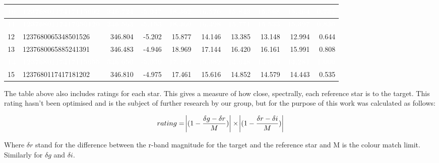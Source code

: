 \documentclass[]{elsarticle} %
\begin{document}
\begin{table}[H]
\begin{tabular}{l|l|r|r|r|r|r|r|r|r}
\hline
\rowcolor[HTML]{D7261E}  \textcolor{white}{\textbf{10}} & \textcolor{white}{\textbf{1237680117417115692}} & \textcolor{white}{\textbf{346.724}} & \textcolor{white}{\textbf{-5.047}} & \textcolor{white}{\textbf{18.362}} & \textcolor{white}{\textbf{16.576}} & \textcolor{white}{\textbf{15.843}} & \textcolor{white}{\textbf{15.568}} & \textcolor{white}{\textbf{15.464}} & \textcolor{white}{\textbf{0.734}}\\
\hline
\rowcolor[HTML]{D7261E}  \textcolor{white}{\textbf{11}} & \textcolor{white}{\textbf{1237680117417050120}} & \textcolor{white}{\textbf{346.563}} & \textcolor{white}{\textbf{-5.153}} & \textcolor{white}{\textbf{18.460}} & \textcolor{white}{\textbf{16.498}} & \textcolor{white}{\textbf{15.771}} & \textcolor{white}{\textbf{15.533}} & \textcolor{white}{\textbf{15.397}} & \textcolor{white}{\textbf{0.830}}\\
\hline
12 & 1237680065348501526 & 346.804 & -5.202 & 15.877 & 14.146 & 13.385 & 13.148 & 12.994 & 0.644\\
\hline
13 & 1237680065885241391 & 346.483 & -4.946 & 18.969 & 17.144 & 16.420 & 16.161 & 15.991 & 0.808\\
\hline
\rowcolor[HTML]{D7261E}  \textcolor{white}{\textbf{14}} & \textcolor{white}{\textbf{1237680117417115655}} & \textcolor{white}{\textbf{346.650}} & \textcolor{white}{\textbf{-5.039}} & \textcolor{white}{\textbf{17.199}} & \textcolor{white}{\textbf{15.382}} & \textcolor{white}{\textbf{14.648}} & \textcolor{white}{\textbf{14.399}} & \textcolor{white}{\textbf{14.281}} & \textcolor{white}{\textbf{1.000}}\\
\hline
15 & 1237680117417181202 & 346.810 & -4.975 & 17.461 & 15.616 & 14.852 & 14.579 & 14.443 & 0.535\\
\hline
\end{tabular}
\end{table}

The table above also includes ratings for each star. This gives a
measure of how close, spectrally, each reference star is to the target.
This rating hasn't been optimised and is the subject of further research
by our group, but for the purpose of this work was calculated as
follows:

\[rating = \abs{(1-\frac{\delta g - \delta r}{M})} \times \abs{(1-\frac{\delta r - \delta i}{M})}\]

Where \(\delta r\) stand for the difference between the r-band magnitude
for the target and the reference star and M is the colour match limit.
Similarly for \(\delta g\) and \(\delta i\).
\end{document}

